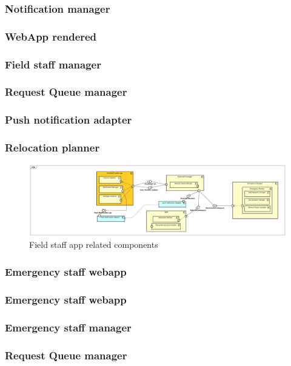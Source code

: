 \documentclass[english]{article}
\begin{document}
		\subsubsection{Notification manager}
		\subsubsection{WebApp rendered}
	\subsubsection{Field staff manager}
		\subsubsection{Request Queue manager}
	\subsubsection{Push notification adapter}
	\subsubsection{Relocation planner }
	\begin{figure}[H]
		\centering
		\includegraphics[scale=0.21]{./ComponentDiagrams/FieldStaff.pdf}%
		\caption{Field staff app related components}
	\end{figure}
	
	
\subsubsection*{Emergency staff webapp}

	\subsubsection{Emergency staff webapp}
	\subsubsection{Emergency staff manager}
		\subsubsection{Request Queue manager}
\end{document}
